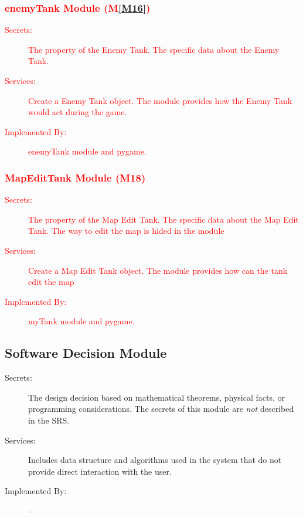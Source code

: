 \documentclass[12pt, titlepage]{article}
\newcommand{\mref}[1]{M\ref{#1}}
\begin{document}
\subsubsection{\textcolor{red}{enemyTank Module  (\mref{M16})}}
\begin{description}
\item[\textcolor{red}{Secrets:}]\textcolor{red}{The property of the Enemy Tank. The specific data about the Enemy Tank.}
\item[\textcolor{red}{Services:}] \textcolor{red}{Create a Enemy Tank object. The module provides how the Enemy Tank would act during the game.}
\item[\textcolor{red}{Implemented By:}] \textcolor{red}{enemyTank module and pygame.}
\end{description}

\subsubsection{\textcolor{red}{MapEditTank Module (M18)}}
\begin{description}
\item[\textcolor{red}{Secrets:}]\textcolor{red}{The property of the Map Edit Tank. The specific data about the Map Edit Tank. The way to edit the map is hided in the module}
\item[\textcolor{red}{Services:}] \textcolor{red}{Create a Map Edit Tank object. The module provides how can the tank edit the map}
\item[\textcolor{red}{Implemented By:}] \textcolor{red}{myTank module and pygame.}
\end{description}


\subsection{Software Decision Module}

\begin{description}
\item[Secrets:] The design decision based on mathematical theorems, physical
  facts, or programming considerations. The secrets of this module are
  \emph{not} described in the SRS.
\item[Services:] Includes data structure and algorithms used in the system that
  do not provide direct interaction with the user. 
\item[Implemented By:] --
\end{description}
\end{document}
